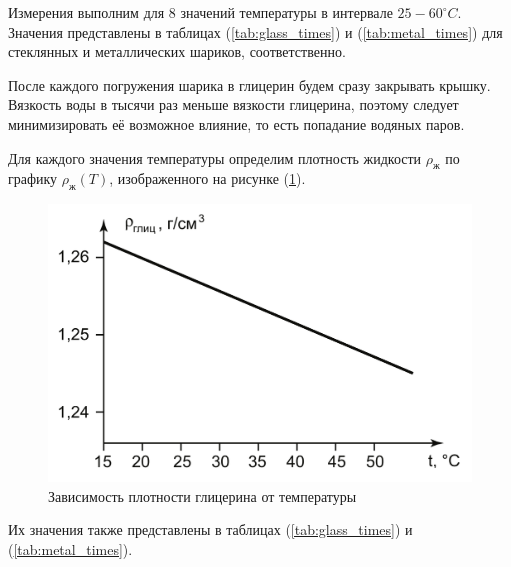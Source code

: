 \documentclass[a4paper,12pt]{article} %
\begin{document}
\begin{enumerate}
	Измерения выполним для $8$ значений температуры в интервале $25-60 ^\circ C$. Значения представлены в таблицах (\ref{tab:glass_times}) и (\ref{tab:metal_times}) для стеклянных и металлических шариков, соответственно.
  
	После каждого погружения шарика в глицерин будем сразу закрывать крышку. Вязкость воды в тысячи раз меньше вязкости глицерина, поэтому следует минимизировать её возможное влияние, то есть попадание водяных паров.

	Для каждого значения температуры определим плотность жидкости $\rho_\text{ж}$ по графику $\rho_\text{ж} (T)$, изображенного на рисунке (\ref{fig:rho_T}). 

	\begin{figure}[h!]
		\centering
		\includegraphics[scale = 0.35]{rho_t.png}
		\caption{Зависимость плотности глицерина от температуры}
		\label{fig:rho_T}
	\end{figure}
	
	Их значения также представлены в таблицах (\ref{tab:glass_times}) и (\ref{tab:metal_times}).


\end{enumerate}
\end{document}

